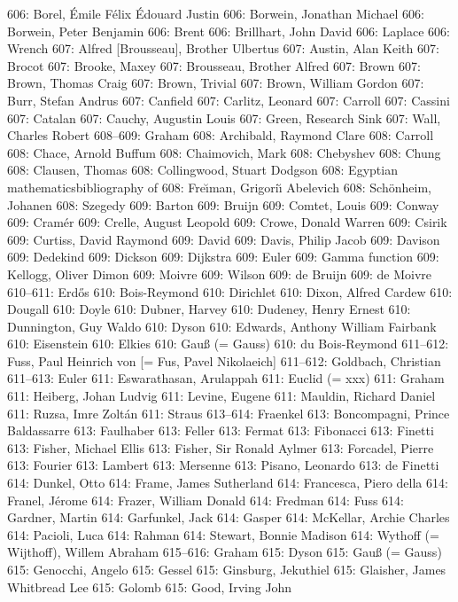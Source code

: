 606: Borel, \'Emile F\'elix \'Edouard Justin
606: Borwein, Jonathan Michael
606: Borwein, Peter Benjamin
606: Brent
606: Brillhart, John David
606: Laplace
606: Wrench
607: Alfred [Brousseau], Brother Ulbertus
607: Austin, Alan Keith
607: Brocot
607: Brooke, Maxey
607: Brousseau, Brother Alfred
607: Brown
607: Brown, Thomas Craig
607: Brown, Trivial
607: Brown, William Gordon
607: Burr, Stefan Andrus
607: Canfield
607: Carlitz, Leonard
607: Carroll
607: Cassini
607: Catalan
607: Cauchy, Augustin Louis
607: Green, Research Sink
607: Wall, Charles Robert
608--609: Graham
608: Archibald, Raymond Clare
608: Carroll
608: Chace, Arnold Buffum
608: Chaimovich, Mark
608: Chebyshev
608: Chung
608: Clausen, Thomas
608: Collingwood, Stuart Dodgson
608: Egyptian mathematics\sub bibliography of
608: Fre{\u\i}man, Grigori{\u\i} Abelevich
608: Sch\"onheim, Johanen
608: Szegedy
609: Barton
609: Bruijn
609: Comtet, Louis
609: Conway
609: Cram\'er
609: Crelle, August Leopold
609: Crowe, Donald Warren
609: Csirik
609: Curtiss, David Raymond
609: David
609: Davis, Philip Jacob
609: Davison
609: Dedekind
609: Dickson
609: Dijkstra
609: Euler
609: Gamma function
609: Kellogg, Oliver Dimon
609: Moivre
609: Wilson
609: de Bruijn
609: de Moivre
610--611: Erd\H os
610: Bois-Reymond
610: Dirichlet
610: Dixon, Alfred Cardew
610: Dougall
610: Doyle
610: Dubner, Harvey
610: Dudeney, Henry Ernest
610: Dunnington, Guy Waldo
610: Dyson
610: Edwards, Anthony William Fairbank
610: Eisenstein
610: Elkies
610: Gau{\ss} (= Gauss)
610: du Bois-Reymond
611--612: Fuss, Paul Heinrich von [= Fus, Pavel Nikolaeich]
611--612: Goldbach, Christian
611--613: Euler
611: Eswarathasan, Arulappah
611: Euclid (= xxx)
611: Graham
611: Heiberg, Johan Ludvig
611: Levine, Eugene
611: Mauldin, Richard Daniel
611: Ruzsa, Imre Zolt\'an
611: Straus
613--614: Fraenkel
613: Boncompagni, Prince Baldassarre
613: Faulhaber
613: Feller
613: Fermat
613: Fibonacci
613: Finetti
613: Fisher, Michael Ellis
613: Fisher, Sir Ronald Aylmer
613: Forcadel, Pierre
613: Fourier
613: Lambert
613: Mersenne
613: Pisano, Leonardo
613: de Finetti
614: Dunkel, Otto
614: Frame, James Sutherland
614: Francesca, Piero della
614: Franel, J\'erome
614: Frazer, William Donald
614: Fredman
614: Fuss
614: Gardner, Martin
614: Garfunkel, Jack
614: Gasper
614: McKellar, Archie Charles
614: Pacioli, Luca
614: Rahman
614: Stewart, Bonnie Madison
614: Wythoff (= Wijthoff), Willem Abraham
615--616: Graham
615: Dyson
615: Gau{\ss} (= Gauss)
615: Genocchi, Angelo
615: Gessel
615: Ginsburg, Jekuthiel
615: Glaisher, James Whitbread Lee
615: Golomb
615: Good, Irving John
